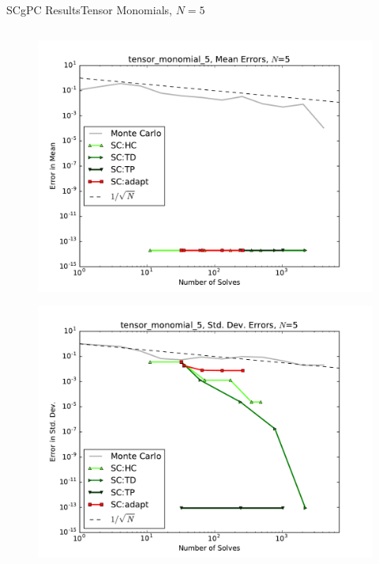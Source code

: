 \documentclass{beamer}
\begin{document}
\begin{frame}{SCgPC Results}{Tensor Monomials, $N=5$}
\begin{columns}
\begin{column}{0.5\textwidth}
\begin{figure}[h!]
          \includegraphics[width=0.8\linewidth]{anlmodels/tensor_monomial_5_mean_errs_nohdmr}
        \end{figure}
        \vspace{-20pt}
        \begin{figure}[h!]
          \centering
          \includegraphics[width=0.8\linewidth]{anlmodels/tensor_monomial_5_variance_errs_nohdmr}
        \end{figure}
   \end{column}
 \end{columns}
\end{frame}
\end{document}
